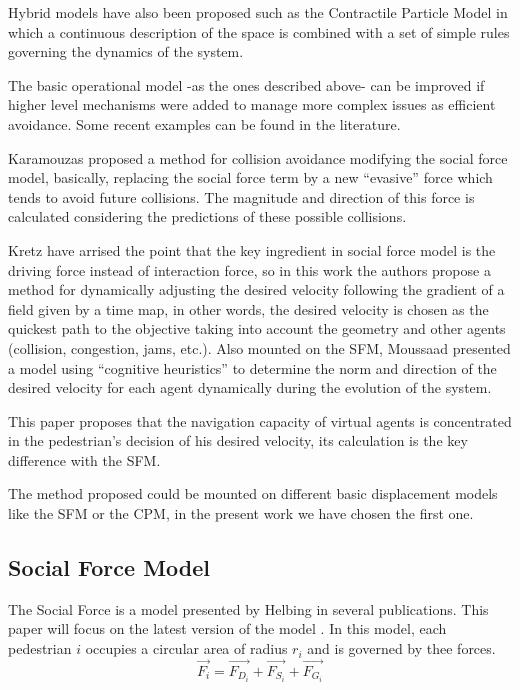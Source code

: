 \documentclass[english]{article}
\begin{document}
Hybrid models have also been proposed such as the Contractile Particle
Model \cite{key-pari2011} in which a continuous description of the
space is combined with a set of simple rules governing the dynamics
of the system.

The basic operational model -as the ones described above- can be improved
if higher level mechanisms were added to manage more complex issues
as efficient avoidance. Some recent examples can be found in the literature.

Karamouzas \cite{key-kara2009} proposed a method for collision avoidance
modifying the social force model, basically, replacing the social
force term by a new ``evasive\textquotedblright{} force which tends
to avoid future collisions. The magnitude and direction of this force
is calculated considering the predictions of these possible collisions.

Kretz \cite{key-kret2001} have arrised the point that the key ingredient
in social force model is the driving force instead of interaction
force, so in this work the authors propose a method for dynamically
adjusting the desired velocity following the gradient of a field given
by a time map, in other words, the desired velocity is chosen as the
quickest path to the objective taking into account the geometry and
other agents (collision, congestion, jams, etc.). Also mounted on
the SFM, Moussaad \cite{key-mous2009} presented a model using ``cognitive
heuristics'' to determine the norm and direction of the desired velocity
for each agent dynamically during the evolution of the system.

This paper proposes that the navigation capacity of virtual agents
is concentrated in the pedestrian's decision of his desired velocity,
its calculation is the key difference with the SFM.

The method proposed could be mounted on different basic displacement
models like the SFM or the CPM, in the present work we have chosen
the first one.


\subsection{Social Force Model}

The Social Force is a model presented by Helbing \cite{key-helb1995,key-helb2000}
in several publications. This paper will focus on the latest version
of the model \cite{key-helb2000}. In this model, each pedestrian
$i$ occupies a circular area of radius $r_{i}$ and is governed by
thee forces. 
\[
\vec{F_{i}}=\vec{F_{D_{i}}}+\vec{F_{S_{i}}}+\vec{F_{G_{i}}}
\]
\end{document}
